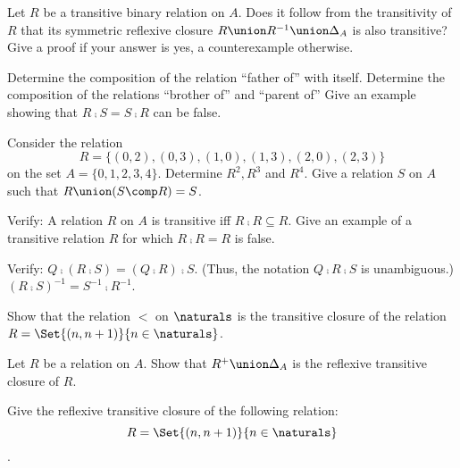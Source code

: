 \begin{Exercise} [number=36]
  Let $R$ be a transitive binary relation on $A$. Does it follow from
  the transitivity of $R$ that its symmetric reflexive closure $R
  \union R^{-1} \union \Delta_A$ is also transitive? Give a proof if
  your answer is yes, a counterexample otherwise.
\end{Exercise}

\begin{Exercise} [number=38]
  Determine the composition of the relation ``father of'' with
  itself. Determine the composition of the relations ``brother of''
  and ``parent of'' Give an example showing that $R \comp S = S \comp
  R$ can be false.
\end{Exercise}

\begin{Exercise} [number=39]
  Consider the relation \[R =
  \{(0,2),(0,3),(1,0),(1,3),(2,0),(2,3)\}\] on the set $A =
  \{0,1,2,3,4\}$.
  \Question Determine $R^2, R^3$ and $R^4$.
  \Question Give a relation $S$ on $A$ such that $R \union (S \comp R)
  = S$.
\end{Exercise}

\begin{Exercise} [number=40]
  Verify:
  \Question A relation $R$ on $A$ is transitive iff $R \comp R
  \subseteq R$.
  \Question Give an example of a transitive relation $R$ for which $R
  \comp R = R$ is false.
\end{Exercise}


\begin{Exercise} [number=41]
  Verify:
  \Question $Q \comp (R \comp S) = (Q \comp R) \comp S$. (Thus, the
  notation $Q \comp R \comp S$ is unambiguous.)
  \Question $(R \comp S)^{-1} = S^{-1} \comp R^{-1}$.
\end{Exercise}


\begin{Exercise} [number=45]
  Show that the relation $<$ on $\naturals$ is the transitive closure
  of the relation $R = \Set{(n,n+1)}{n \in \naturals}$.
\end{Exercise}

\begin{Exercise} [number=46]
  Let $R$ be a relation on $A$. Show that $R^+ \union \Delta_A$ is the
  reflexive transitive closure of $R$.
\end{Exercise}

\begin{Exercise} [number=47]
  Give the reflexive transitive closure of the following relation: \[R
  = \Set{(n,n+1)}{n \in \naturals}\].
\end{Exercise}

